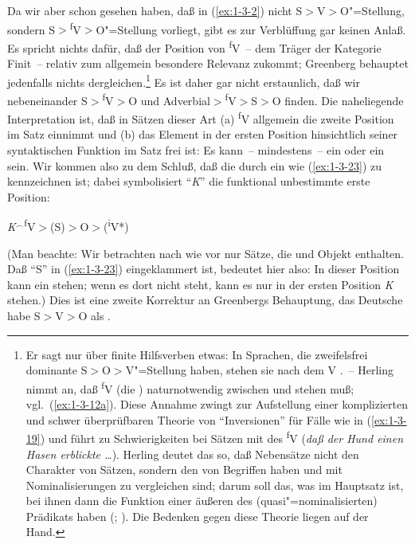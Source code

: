\documentclass[output=paper]{langsci/langscibook}
\begin{document}
Da wir aber schon gesehen haben, daß in (\ref{ex:1-3-2}) nicht
S$>$V$>$O"=Stellung, sondern S$>$\textsuperscript{f}V$>$O"=Stellung
vorliegt, gibt es zur Verblüffung gar keinen Anlaß. Es spricht nichts
dafür, daß der Position von \textsuperscript{f}V~-- dem Träger der
Kategorie Finit~-- relativ zum  allgemein besondere Relevanz
zukommt; Greenberg behauptet jedenfalls nichts
dergleichen.\footnote{%
  Er sagt nur über finite Hilfsverben etwas: In
  Sprachen, die zweifelsfrei dominante S$>$O$>$V"=Stellung haben,
  stehen sie nach dem V \citep[84]{Greenberg1963}.~-- Herling
  nimmt an, daß \textsuperscript{f}V (die ) naturnotwendig
  zwischen  und  stehen muß;
  vgl.\ (\ref{ex:1-3-12a}). Diese Annahme zwingt zur Aufstellung einer
  komplizierten und schwer überprüfbaren Theorie von "`Inversionen"' für
  Fälle wie in (\ref{ex:1-3-19}) und führt zu Schwierigkeiten bei
  Sätzen mit  des \textsuperscript{f}V (\zb \emph{daß der
  Hund einen Hasen erblickte \ldots}). Herling deutet das so, daß
  Nebensätze nicht den Charakter von Sätzen, sondern den von Begriffen
  haben und mit Nominalisierungen zu vergleichen sind; darum soll das,
  was im Hauptsatz  ist, bei ihnen dann die Funktion einer
  äußeren  des (quasi"=nominalisierten) Prädikats
  haben (\citeyear*[319ff]{Herling1821T}; \citeyear[89f]{Herling1830}). Die Bedenken gegen
  diese Theorie liegen auf der Hand.%
}
Es ist daher gar nicht erstaunlich, daß wir nebeneinander S$>$\textsuperscript{f}V$>$O und
Adverbial$>$\textsuperscript{f}V$>$S$>$O finden. Die naheliegende
Interpretation ist, daß in Sätzen dieser Art (a) \textsuperscript{f}V
allgemein die zweite Position im Satz einnimmt und (b) das Element in
der
ersten Position hinsichtlich seiner syntaktischen Funktion im Satz frei ist: Es kann~-- mindestens~-- ein  oder ein  sein. Wir kommen also zu
dem Schluß, daß die  durch ein  wie (\ref{ex:1-3-23}) zu kennzeichnen ist; dabei symbolisiert "`\textit{K}"' die funktional unbestimmte erste Position:
\begin{exe}
\ex\label{ex:1-3-23}
\textit{K}$^{\smallfrown}$\textsuperscript{f}V$>$(S)$>$O$>$(\textsuperscript{i}V*)
\end{exe}
(Man beachte: Wir betrachten nach wie vor nur Sätze, die  und Objekt enthalten. Daß "`S"' in (\ref{ex:1-3-23}) eingeklammert ist, bedeutet hier also: In dieser Position kann ein
 stehen; wenn es dort nicht steht, kann es nur in der ersten Position \textit{K} stehen.)
Dies ist eine zweite Korrektur an Greenbergs Behauptung, das Deutsche habe
S$>$V$>$O als .
\end{document}
